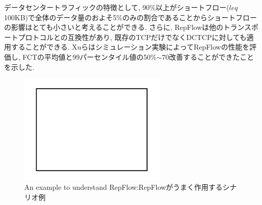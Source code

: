 データセンタートラフィックの特徴として,
90\%以上がショートフロー($leq$100KB)で全体のデータ量のおよそ5\%のみの割合である\cite{dctcp,
pfabric}ことからショートフローの影響はとても小さいと考えることができる. 
さらに, RepFlowは他のトランスポートプロトコルとの互換性があり,
既存のTCPだけでなくDCTCP\cite{dctcp}に対しても適用することができる. 
Xuらはシミュレーション実験によってRepFlowの性能を評価し,
FCTの平均値と99パーセンタイル値の50\%$\sim$70改善することができたことを示した. 
\begin{figure}[t]
    \begin{center}
    \includegraphics[autoebb, width=200pt]{./img/test.pdf}
    \caption{An example to understand RepFlow:RepFlowがうまく作用するシナリオ例}
    \label{fig:repflow_scheario}
    \end{center}
\end{figure}
% 
